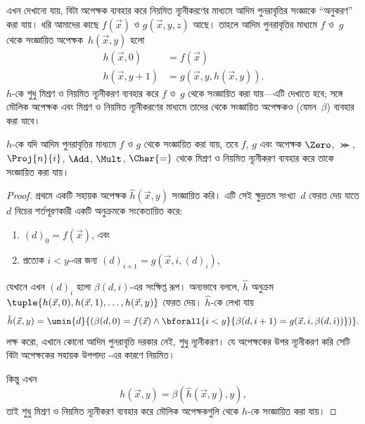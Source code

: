 \documentclass[../../../include/open-logic-section]{subfiles}
\begin{document}

এখন দেখানো যায়, বিটা অপেক্ষক ব্যবহার করে নিয়মিত ন্যূনীকরণের মাধ্যমে আদিম
পুনরাবৃত্তির সংজ্ঞাকে ``অনুকরণ'' করা যায়। ধরি আমাদের কাছে $f(\vec x)$ ও
$g(\vec x, y, z)$ আছে। তাহলে আদিম পুনরাবৃত্তির মাধ্যমে $f$ ও~$g$ থেকে
সংজ্ঞায়িত অপেক্ষক~$h(\vec x,y)$ হলো
\begin{align*}
h(\vec x, 0) & =  f(\vec x) \\
h(\vec x, y+1) & =  g(\vec x, y, h(\vec x, y)).
\end{align*}
$h$-কে শুধু মিশ্রণ ও নিয়মিত ন্যূনীকরণ ব্যবহার করে $f$ ও~$g$ থেকে সংজ্ঞায়িত
করা যায়—এটি দেখাতে হবে; সঙ্গে মৌলিক অপেক্ষক এবং মিশ্রণ ও নিয়মিত
ন্যূনীকরণের মাধ্যমে তাদের থেকে সংজ্ঞায়িত অপেক্ষকও (যেমন~$\beta$) ব্যবহার
করা যাবে।

\begin{lem}
$h$-কে যদি আদিম পুনরাবৃত্তির মাধ্যমে $f$ ও $g$ থেকে সংজ্ঞায়িত করা যায়,
তবে $f$, $g$ এবং অপেক্ষক $\Zero$, $\Succ$, $\Proj{n}{i}$, $\Add$,
$\Mult$, $\Char{=}$ থেকে মিশ্রণ ও নিয়মিত ন্যূনীকরণ ব্যবহার করে তাকে
সংজ্ঞায়িত করা যায়।
\end{lem}

\begin{proof}
প্রথমে একটি সহায়ক অপেক্ষক $\hat h(\vec x, y)$ সংজ্ঞায়িত করি। এটি সেই
ক্ষুদ্রতম সংখ্যা~$d$ ফেরত দেয় যাতে $d$ নিচের শর্তপূরণকারী একটি অনুক্রমকে
সংকেতায়িত করে:
\begin{enumerate}
\item $(d)_0 = f(\vec x)$, এবং
\item প্রত্যেক $i < y$-এর জন্য $(d)_{i+1} = g(\vec x, i, (d)_i)$,
\end{enumerate}
যেখানে এখন $(d)_i$ হলো $\beta(d,i)$-এর সংক্ষিপ্ত রূপ। অন্যভাবে বললে,
$\hat h$ অনুক্রম $\tuple{h(\vec x, 0), h(\vec x, 1), \dots, h(\vec
x, y)}$ ফেরত দেয়। $\hat h$-কে লেখা যায়
\[
\hat h(\vec x, y) = \umin{d}{(\beta(d,0) = f(\vec x) \land \bforall{i <
  y}{\beta(d,i+1) = g(\vec x, i,\beta(d,i))})}.
\]
লক্ষ করো, এখানে কোনো আদিম পুনরাবৃত্তি দরকার নেই, শুধু ন্যূনীকরণ। যে অপেক্ষকের
উপর ন্যূনীকরণ করি সেটি বিটা অপেক্ষকের সহায়ক উপপাদ্য
-এর কারণে নিয়মিত।

কিন্তু এখন
\[
h(\vec x, y) = \beta(\hat h(\vec x, y), y),
\]
তাই শুধু মিশ্রণ ও নিয়মিত ন্যূনীকরণ ব্যবহার করে মৌলিক অপেক্ষকগুলি থেকে $h$-কে
সংজ্ঞায়িত করা যায়।
\end{proof}
\end{document}
